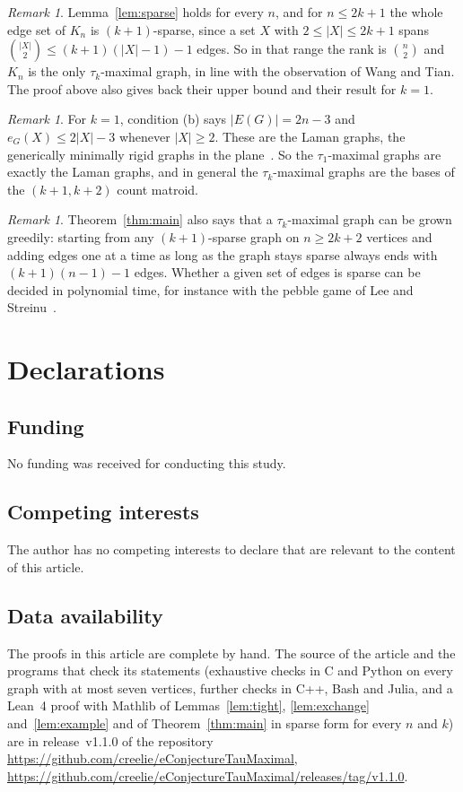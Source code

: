 \documentclass[11pt]{amsart}
\theoremstyle{definition}
\theoremstyle{remark}
\newtheorem{remark}[theorem]{Remark}
\numberwithin{equation}{section}
\begin{document}
\begin{remark}
Lemma~\ref{lem:sparse} holds for every $n$, and for $n\le 2k+1$ the whole edge set of $K_n$ is $(k+1)$-sparse, since a set $X$ with $2\le|X|\le 2k+1$ spans $\binom{|X|}2\le(k+1)(|X|-1)-1$ edges. So in that range the rank is $\binom n2$ and $K_n$ is the only $\tau_k$-maximal graph, in line with the observation of Wang and Tian. The proof above also gives back their upper bound and their result for $k=1$.
\end{remark}

\begin{remark}
For $k=1$, condition (b) says $|E(G)|=2n-3$ and $e_G(X)\le 2|X|-3$ whenever $|X|\ge2$. These are the Laman graphs, the generically minimally rigid graphs in the plane~\cite{Laman}. So the $\tau_1$-maximal graphs are exactly the Laman graphs, and in general the $\tau_k$-maximal graphs are the bases of the $(k+1,k+2)$ count matroid.
\end{remark}

\begin{remark}
Theorem~\ref{thm:main} also says that a $\tau_k$-maximal graph can be grown greedily: starting from any $(k+1)$-sparse graph on $n\ge 2k+2$ vertices and adding edges one at a time as long as the graph stays sparse always ends with $(k+1)(n-1)-1$ edges. Whether a given set of edges is sparse can be decided in polynomial time, for instance with the pebble game of Lee and Streinu~\cite{LS}.
\end{remark}

\section*{Declarations}

\subsection*{Funding} No funding was received for conducting this study.

\subsection*{Competing interests} The author has no competing interests to declare that are relevant to the content of this article.

\subsection*{Data availability} The proofs in this article are complete by hand. The source of the article and the programs that check its statements (exhaustive checks in C and Python on every graph with at most seven vertices, further checks in C++, Bash and Julia, and a Lean~4 proof with Mathlib of Lemmas~\ref{lem:tight}, \ref{lem:exchange} and~\ref{lem:example} and of Theorem~\ref{thm:main} in sparse form for every $n$ and $k$) are in release~v1.1.0 of the repository \url{https://github.com/creelie/eConjectureTauMaximal}, \url{https://github.com/creelie/eConjectureTauMaximal/releases/tag/v1.1.0}.
\end{document}
